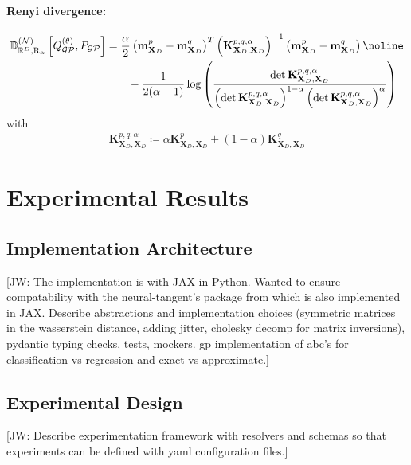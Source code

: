 \documentclass{article}
\newcommand{\jw}[1]{{\color{gray} [JW: #1]}}
\newcommand{\GP}{\operatorname{\mathcal{GP}}}
\numberwithin{equation}{section}
\begin{document}
\paragraph{Renyi divergence:} 
\begin{align}
    \mathbb{D}_{\mathbb{R}^D, \text{R}_\alpha}^{(\mathcal{N})} \left[Q_{\GP}^{(\theta)}, P_{\GP}\right] &= \frac{\alpha}{2}\left(\mathbf{m}_{\mathbf{X}_D}^p - \mathbf{m}_{\mathbf{X}_D}^q\right)^T \left(\mathbf{K}_{\mathbf{X}_D, \mathbf{X}_D}^{p, q, \alpha}\right)^{-1}\left(\mathbf{m}_{\mathbf{X}_D}^p - \mathbf{m}_{\mathbf{X}_D}^q\right) \noline \\
    & \qquad - \frac{1}{2(\alpha -1)} \log\left(\frac{\det \mathbf{K}_{\mathbf{X}_D, \mathbf{X}_D}^{p, q, \alpha}}{\left(\det \mathbf{K}_{\mathbf{X}_D, \mathbf{X}_D}^{p, q, \alpha}\right)^{1-\alpha}\left(\det \mathbf{K}_{\mathbf{X}_D, \mathbf{X}_D}^{p, q, \alpha}\right)^{\alpha}}\right)
\end{align}
with 
\begin{align}
    \mathbf{K}_{\mathbf{X}_D, \mathbf{X}_D}^{p, q, \alpha} \coloneqq \alpha \mathbf{K}_{\mathbf{X}_D, \mathbf{X}_D}^{p} + (1-\alpha) \mathbf{K}_{\mathbf{X}_D, \mathbf{X}_D}^{q}
\end{align}
\newpage
\section{Experimental Results}
\subsection{Implementation Architecture}

\jw{The implementation is with JAX in Python. Wanted to ensure compatability with the neural-tangent's package from \cite{novak2019neural} which is also implemented in JAX. Describe abstractions and implementation choices (symmetric matrices in the wasserstein distance, adding jitter, cholesky decomp for matrix inversions), pydantic typing checks, tests, mockers. gp implementation of abc's for classification vs regression and exact vs approximate.}

\subsection{Experimental Design}
\jw{Describe experimentation framework with resolvers and schemas so that experiments can be defined with yaml configuration files.}
\end{document}
